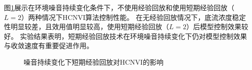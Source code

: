 图\ref{fig:noise_replay_cmp}展示在环境噪音持续变化条件下，不使用经验回放和使用短期经验回放（$L=2$）两种情况下HCNVI算法控制性能。
在无经验回放情况下，底流浓度稳定性明显较差，且效用值明显较高，使用短期经验回放（$L=2$）后模型控制效果较好。
实验结果表明，短期经验回放技术在环境噪音持续变化下仍对模型控制效果与收敛速度有重要促进作用。

\begin{figure}[!ht]
\caption{噪音持续变化下短期经验回放对HCNVI的影响 }
    \label{fig:noise_replay_cmp}
\end{figure}

